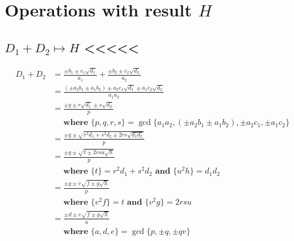 \documentclass{article}
\begin{document}



\section{Operations with result $H$}

\subsection{$D_1 + D_2 \mapsto H$ <<<<<}
\begin{align}
D_1 + D_2 &= \frac{\pm b_1 \pm c_1\sqrt{d_1}}{a_1} + \frac{\pm b_2 \pm c_2\sqrt{d_2}}{a_2}\\
 &= \frac{(\pm a_2b_1 \pm a_1b_2) \pm a_2c_1\sqrt{d_1} \pm a_1c_2\sqrt{d_2}}{a_1a_2}\\
 &= \frac{\pm q \pm r\sqrt{d_1} \pm s\sqrt{d_2}}{p} \\
 &\quad \textbf{ where } \{ p,q,r,s \} = \gcd \{ a_1a_2, (\pm a_2b_1 \pm a_1b_2), \pm a_2c_1, \pm a_1c_2 \} \nonumber \\
 &= \frac{\pm q \pm \sqrt{r^2d_1 + s^2d_2 \pm 2rs\sqrt{d_1d_2}}}{p} \\
 &= \frac{\pm q \pm \sqrt{t \pm 2rsu\sqrt{h}}}{p} \\
 &\quad \textbf{ where } \{ t \} = r^2d_1 + s^2d_2 \textbf{ and } \{ u^2h \} = d_1d_2 \nonumber \\
 &= \frac{\pm q \pm v\sqrt{f \pm g\sqrt{h}}}{p} \\
 &\quad \textbf{ where } \{ v^2f \} = t \textbf{ and } \{ v^2g \} = 2rsu \nonumber \\
 &= \frac{\pm d \pm e\sqrt{f \pm g\sqrt{h}}}{a} \\
 &\quad \textbf{ where } \{a,d,e\} = \gcd\{ p, \pm q, \pm qv \} \nonumber \\
\end{align}
\end{document}
